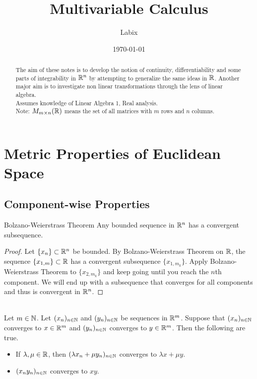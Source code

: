 \documentclass[a4paper]{article}
\title{Multivariable Calculus}
\author{Labix}
\date{\today}
\begin{document}
\maketitle
\begin{abstract}
The aim of these notes is to develop the notion of continuity, differentiability and some parts of integrability in $\mathbb{R}^n$ by attempting to generalize the same ideas in $\mathbb{R}$. Another major aim is to investigate non linear transformations  through the lens of linear algebra. \\
Assumes knowledge of Linear Algebra 1, Real analysis. \\
Note: $M_{m\times n}(\mathbb{R})$ means the set of all matrices with $m$ rows and $n$ columns. 
\end{abstract}
\pagebreak
\tableofcontents
\pagebreak

\section{Metric Properties of Euclidean Space}
\subsection{Component-wise Properties}
\begin{thm}{Bolzano-Weierstrass Theorem}{} Any bounded sequence in $\mathbb{R}^n$ has a convergent subsequence. 
\begin{proof} Let $\{x_n\}\subset\mathbb{R}^n$ be bounded. By Bolzano-Weierstrass Theorem on $\mathbb{R}$, the sequence $\{x_{1,m}\}\subset\mathbb{R}$ has a convergent subsequence $\{x_{1,m_k}\}$. Apply Bolzano-Weierstrass Theorem to $\{x_{2,m_k}\}$ and keep going until you reach the $n$th component. We will end up with a subsequence that converges for all components and thus is convergent in $\mathbb{R}^n$. 
\end{proof}
\end{thm}

\begin{prp}{}{}\\
Let $m\in\mathbb{N}$. Let $(x_n)_{n\in\mathbb{N}}$ and $(y_n)_{n\in\mathbb{N}}$ be sequences in $\mathbb{R}^m$. Suppose that $(x_n)_{n\in\mathbb{N}}$ converges to $x\in\mathbb{R}^m$ and $(y_n)_{n\in\mathbb{N}}$ converges to $y\in\mathbb{R}^m$. Then the following are true. 
\begin{itemize}
\item If $\lambda,\mu\in\mathbb{R}$, then $(\lambda x_n+\mu y_n)_{n\in\mathbb{N}}$ converges to $\lambda x+\mu y$. 
\item $(x_ny_n)_{n\in\mathbb{N}}$ converges to $xy$. 
\end{itemize}
\end{prp}
\end{document}
